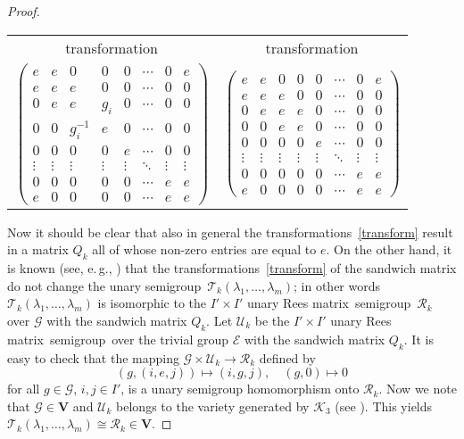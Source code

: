 \documentclass[11pt,reqno]{amsart}
\numberwithin{equation}{section}
\theoremstyle{remark}
\def\Vc{\mathbf{V}}
\def\la{\lambda}
\def\Rm{Rees matrix}
\def\sm{semi\-group}
\def\va{variet}
\begin{document}
\begin{proof}
{\begin{center}
\begin{tabular}{cc}
transformation   & transformation\\[1ex]
$\begin{pmatrix}
e        & e   & 0 & 0 &  0 &\cdots & 0 & e \\
e        & e   & e & 0 &  0 &\cdots & 0 & 0 \\
0        & e & e & g_i &  0 &\cdots & 0 & 0 \\
0 & 0   & g_i^{-1} & e &  0 &\cdots & 0 & 0 \\
0        & 0   & 0 & 0 &  e &\cdots & 0 & 0 \\
\vdots   & \vdots & \vdots & \vdots & \vdots &\ddots & \vdots & \vdots \\
0        & 0   & 0 & 0 &  0 &\cdots & e & e \\
e        & 0   & 0 & 0 &  0 &\cdots & e & e
\end{pmatrix}$
& $\begin{pmatrix}
e        & e   & 0 & 0 &  0 &\cdots & 0 & e \\
e        & e   & e & 0 &  0 &\cdots & 0 & 0 \\
0        & e   & e & e &  0 &\cdots & 0 & 0 \\
0        & 0   & e & e &  0 &\cdots & 0 & 0 \\
0        & 0   & 0 & 0 &  e &\cdots & 0 & 0 \\
\vdots   & \vdots & \vdots & \vdots & \vdots &\ddots & \vdots & \vdots \\
0        & 0   & 0 & 0 &  0 &\cdots & e & e \\
e        & 0   & 0 & 0 &  0 &\cdots & e & e
\end{pmatrix}$\\
\end{tabular}
\end{center}

} \noindent Now it should be clear that also in general the
transformations~\eqref{transform} result in a matrix $Q_k$ all of
whose non-zero entries are equal to $e$. On the other hand, it is
known (see, e.\,g., \cite[Proposition~6.2]{A1}) that the
transformations~\eqref{transform} of the sandwich matrix do not
change the unary \sm\ $\mathcal{T}_k(\la_1,\ldots,\la_m)$; in
other words $\mathcal{T}_k(\la_1,\ldots,\la_m)$ is isomorphic to
the $I'\times I'$ unary \Rm \ \sm \ $\mathcal{R}_k$ over
$\mathcal{G}$ with the sandwich matrix $Q_k$. Let $\mathcal{U}_k$
be the $I'\times I'$ unary \Rm \ \sm\ over the trivial group
$\mathcal{E}$ with the sandwich matrix $Q_k$. It is easy to check
that the mapping $\mathcal{G}\times \mathcal{U}_k\rightarrow
\mathcal{R}_k$ defined by
$$(g,(i,e,j))\mapsto (i,g,j),\quad  (g,0)\mapsto 0$$
for all $g\in \mathcal{G}$, $i,j\in I'$, is a unary semigroup
homomorphism onto $\mathcal{R}_k$. Now we note that $\mathcal{G}
\in {\Vc}$ and $\mathcal{U}_k$ belongs to the \va y generated by
$\mathcal{K}_3$ (see \cite[Theorem 5.2]{A1}). This yields
$\mathcal{T}_k(\la_1,\ldots,\la_m)\cong\mathcal{R}_k\in{\Vc}$.


\end{proof}
\end{document}
